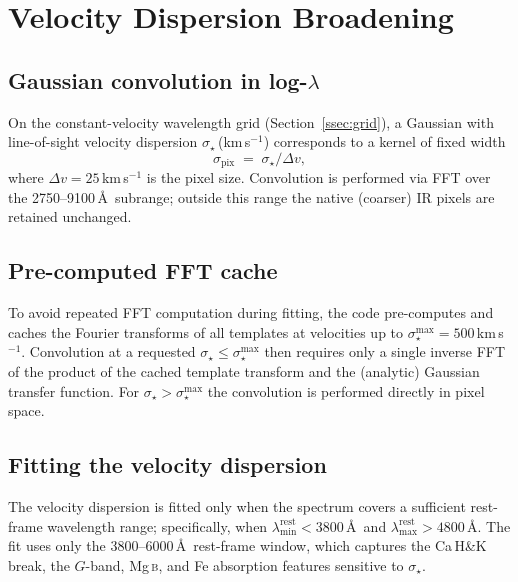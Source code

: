\documentclass[12pt]{article}
\newcommand{\vdisp}{\sigma_{\star}}
\begin{document}
\section{Velocity Dispersion Broadening}
\label{sec:vdisp}

\subsection{Gaussian convolution in log-$\lambda$}
\label{ssec:conv}

On the constant-velocity wavelength grid (Section~\ref{ssec:grid}), a
Gaussian with line-of-sight velocity dispersion $\vdisp$\,(km\,s$^{-1}$)
corresponds to a kernel of fixed width
\begin{equation}
  \sigma_{\mathrm{pix}} \;=\; \vdisp / \Delta v,
  \label{eq:sigma_pix}
\end{equation}
where $\Delta v = 25$\,km\,s$^{-1}$ is the pixel size.  Convolution is
performed via FFT over the 2750--9100\,\AA\ subrange; outside this range the
native (coarser) IR pixels are retained unchanged.

\subsection{Pre-computed FFT cache}
\label{ssec:cache}

To avoid repeated FFT computation during fitting, the code pre-computes and
caches the Fourier transforms of all templates at velocities up to
$\vdisp^{\mathrm{max}} = 500$\,km\,s$^{-1}$.  Convolution at a requested
$\vdisp \leq \vdisp^{\mathrm{max}}$ then requires only a single inverse FFT
of the product of the cached template transform and the (analytic) Gaussian
transfer function.  For $\vdisp > \vdisp^{\mathrm{max}}$ the convolution is
performed directly in pixel space.

\subsection{Fitting the velocity dispersion}
\label{ssec:vdispfit}

The velocity dispersion is fitted only when the spectrum covers a sufficient
rest-frame wavelength range; specifically, when $\lambda_{\min}^{\mathrm{rest}}
< 3800$\,\AA\ and $\lambda_{\max}^{\mathrm{rest}} > 4800$\,\AA.  The fit
uses only the 3800--6000\,\AA\ rest-frame window, which captures the Ca\,H\&K
break, the $G$-band, Mg\,\textsc{b}, and Fe absorption features sensitive to
$\vdisp$.
\end{document}
